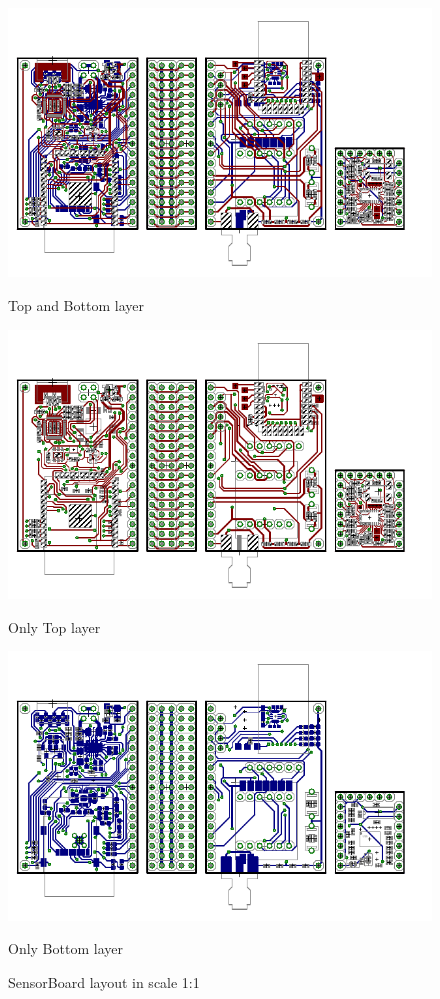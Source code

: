 \begin{figure}
	\centering
	\includegraphics[scale=1]{img/brd.pdf}
	\vspace{-0.5cm}
	\begin{center}
		Top and Bottom layer
	\end{center}
	\includegraphics[scale=1]{img/brdTop.pdf}
	\vspace{-0.5cm}
	\begin{center}
		Only Top layer
	\end{center}
	\includegraphics[scale=1]{img/brdBottom.pdf}
	\vspace{-0.5cm}
	\begin{center}
		Only Bottom layer
	\end{center}
	\label{brd1}
	\caption{SensorBoard layout in scale 1:1}
\end{figure}

